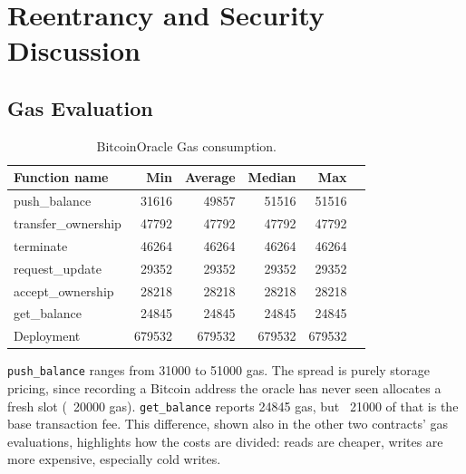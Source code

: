 
\chapter{Reentrancy and Security Discussion}
\label{Chapter2}
\setlength{\parindent}{0pt}

\section{Gas Evaluation}

\begin{table}[ht]
	\centering
	\caption{BitcoinOracle Gas consumption.}
	\label{tab:bitcoinoracle_gas}
	\begin{tabular}{lrrrrr}
		\toprule
		\textbf{Function name} & \textbf{Min} & \textbf{Average} & \textbf{Median} & \textbf{Max} \\
		\midrule
		push\_balance         & 31616  & 49857  & 51516  & 51516  \\
		transfer\_ownership   & 47792  & 47792  & 47792  & 47792  \\
		terminate             & 46264  & 46264  & 46264  & 46264  \\
		request\_update       & 29352  & 29352  & 29352  & 29352  \\
		accept\_ownership     & 28218  & 28218  & 28218  & 28218  \\
		get\_balance          & 24845  & 24845  & 24845  & 24845  \\
		\midrule
		Deployment            & 679532 & 679532 & 679532 & 679532 \\
		\bottomrule
	\end{tabular}
\end{table}

\texttt{push\_balance} ranges from 31000 to 51000 gas. The spread is purely storage pricing, since recording a Bitcoin address the oracle has never seen allocates a fresh slot (~20000 gas). \texttt{get\_balance} reports 24845 gas, but ~21000 of that is the base transaction fee. This difference, shown also in the other two contracts' gas evaluations, highlights how the costs are divided: reads are cheaper, writes are more expensive, especially cold writes.


